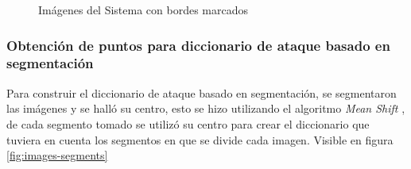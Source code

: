 \begin{figure}[ht]
\begin{minipage}[hb]{0.3\textwidth}
	\end{minipage}
	\caption{Imágenes del Sistema con bordes marcados}
	\label{fig:images-borders}
\end{figure}


\subsubsection{Obtenci\'on de puntos para diccionario de ataque basado en segmentaci\'on}
Para construir el diccionario de ataque basado en segmentación, se segmentaron las im\'agenes y se hall\'o su centro, esto se hizo utilizando el algoritmo \textit{Mean Shift} \cite{Comaniciu2002MeanSA}, de cada segmento tomado se utiliz\'o su centro para crear el diccionario que tuviera en cuenta los segmentos en que se divide cada imagen. Visible en figura \ref{fig:images-segments}

